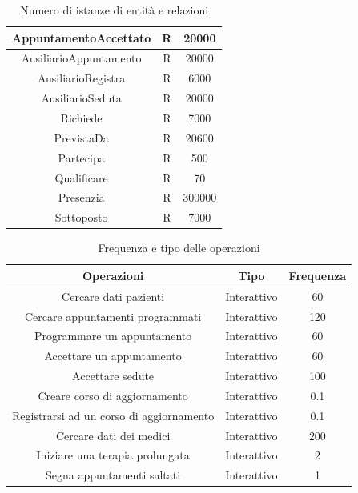 \documentclass[11pt,a4paper]{article}
\begin{document}
\begin{table}[H]
\begin{tabular}{|c|c|c|}
\hline AppuntamentoAccettato     & R             & 20000              \\
\hline AusiliarioAppuntamento    & R             & 20000              \\
\hline AusiliarioRegistra        & R             & 6000               \\
\hline AusiliarioSeduta          & R             & 20000              \\
\hline Richiede                  & R             & 7000               \\
\hline PrevistaDa                & R             & 20600              \\
\hline Partecipa                 & R             & 500                \\
\hline Qualificare               & R             & 70                 \\
\hline Presenzia                 & R             & 300000             \\
\hline Sottoposto                & R             & 7000               \\
\hline
\end{tabular}
    \caption{Numero di istanze di entità e relazioni}
    \label{tab:istanze}
\end{table}

\begin{table}[H]
\begin{tabular}{|c|c|c|}
\hline \textbf{Operazioni}                      & \textbf{Tipo} & \textbf{Frequenza} \\
\hline Cercare dati pazienti                    & Interattivo   & 60                 \\
\hline Cercare appuntamenti programmati         & Interattivo   & 120                \\
\hline Programmare un appuntamento              & Interattivo   & 60                 \\
\hline Accettare un appuntamento                & Interattivo   & 60                 \\
\hline Accettare sedute                         & Interattivo   & 100                \\
\hline Creare corso di aggiornamento            & Interattivo   & 0.1                \\
\hline Registrarsi ad un corso di aggiornamento & Interattivo   & 0.1                \\
\hline Cercare dati dei medici                  & Interattivo   & 200                \\
\hline Iniziare una terapia prolungata          & Interattivo   & 2                  \\
\hline Segna appuntamenti saltati               & Interattivo   & 1                  \\
\hline
\end{tabular}
    \caption{Frequenza e tipo delle operazioni}
    \label{tab:operazioni}
\end{table}
\end{document}
